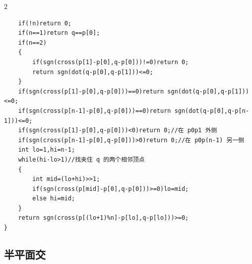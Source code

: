 \documentclass[UTF8,fontset=fandol,a4paper,twoside]{ctexart}
\begin{document}
\begin{multicols}{2}
\begin{lstlisting}
    if(!n)return 0;
    if(n==1)return q==p[0];
    if(n==2)
    {
        if(sgn(cross(p[1]-p[0],q-p[0]))!=0)return 0;
        return sgn(dot(q-p[0],q-p[1]))<=0;
    }
    if(sgn(cross(p[1]-p[0],q-p[0]))==0)return sgn(dot(q-p[0],q-p[1]))<=0;
    if(sgn(cross(p[n-1]-p[0],q-p[0]))==0)return sgn(dot(q-p[0],q-p[n-1]))<=0;
    if(sgn(cross(p[1]-p[0],q-p[0]))<0)return 0;//在 p0p1 外侧
    if(sgn(cross(p[n-1]-p[0],q-p[0]))>0)return 0;//在 p0p(n-1) 另一侧
    int lo=1,hi=n-1;
    while(hi-lo>1)//找夹住 q 的两个相邻顶点
    {
        int mid=(lo+hi)>>1;
        if(sgn(cross(p[mid]-p[0],q-p[0]))>=0)lo=mid;
        else hi=mid;
    }
    return sgn(cross(p[(lo+1)%n]-p[lo],q-p[lo]))>=0;
}
\end{lstlisting}
\subsection{半平面交}


\end{multicols}
\end{document}
